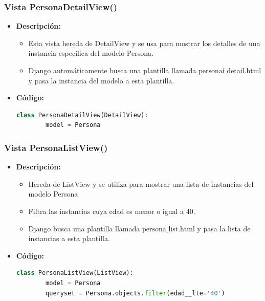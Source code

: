 \documentclass{article}
\begin{document}
  
  \subsubsection{Vista PersonaDetailView()}
  \begin{itemize}
    \item \textbf{Descripción: }
    \begin{itemize}
      \item Esta vista hereda de DetailView y se usa para mostrar los detalles de una instancia específica del modelo Persona.
      \item Django automáticamente busca una plantilla llamada $\text{personaí\_detail.html}$ y pasa la instancia del modelo a esta plantilla.
    \end{itemize}
    \item \textbf{Código: }
    \begin{lstlisting}[language=Python]
      class PersonaDetailView(DetailView):
        model = Persona
    \end{lstlisting}   
  \end{itemize}
  
  
  \subsubsection{Vista PersonaListView()}
  \begin{itemize}
    \item \textbf{Descripción: }
    \begin{itemize}
      \item Hereda de ListView y se utiliza para mostrar una lista de instancias del modelo Persona
      \item Filtra las instancias cuya edad es menor o igual a 40.
      \item Django busca una plantilla llamada $\text{persona\_list.html}$ y pasa la lista de instancias a esta plantilla.
    \end{itemize}
    \item \textbf{Código: }
    \begin{lstlisting}[language=Python]
      class PersonaListView(ListView):
        model = Persona
        queryset = Persona.objects.filter(edad__lte='40')
    \end{lstlisting}   
  \end{itemize}
  
  
\end{document}

